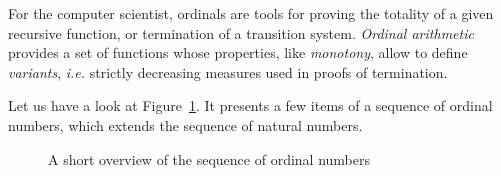 For the computer scientist, ordinals are tools for proving the totality of a given recursive function, or termination of a transition system. \emph{Ordinal arithmetic} 
provides a set of functions whose properties, like \emph{monotony}, allow to define \emph{variants}, \emph{i.e.} strictly decreasing measures used in proofs of termination.


Let us have a look at Figure~\ref{fig:ordinal-sequence}. It presents a few items of a  sequence of ordinal numbers, which extends the sequence of natural numbers. 




\begin{figure}[h]
  \centering
{}
 
 
  \caption{A short overview of the sequence of ordinal numbers}
  \label{fig:ordinal-sequence}
\end{figure}



